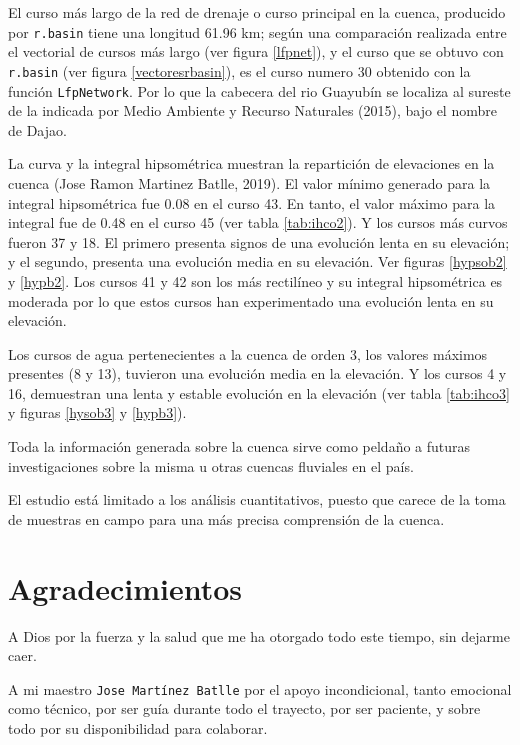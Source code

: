 \documentclass[11pt,]{article}
\begin{document}
El curso más largo de la red de drenaje o curso principal en la cuenca,
producido por \texttt{r.basin} tiene una longitud 61.96 km; según una
comparación realizada entre el vectorial de cursos más largo (ver figura
\ref{lfpnet}), y el curso que se obtuvo con \texttt{r.basin} (ver figura
\ref{vectoresrbasin}), es el curso numero 30 obtenido con la función
\texttt{LfpNetwork}. Por lo que la cabecera del rio Guayubín se localiza
al sureste de la indicada por Medio Ambiente y Recurso Naturales (2015),
bajo el nombre de Dajao.

La curva y la integral hipsométrica muestran la repartición de
elevaciones en la cuenca (Jose Ramon Martinez Batlle, 2019). El valor
mínimo generado para la integral hipsométrica fue 0.08 en el curso 43.
En tanto, el valor máximo para la integral fue de 0.48 en el curso 45
(ver tabla \ref{tab:ihco2}). Y los cursos más curvos fueron 37 y 18. El
primero presenta signos de una evolución lenta en su elevación; y el
segundo, presenta una evolución media en su elevación. Ver figuras
\ref{hypsob2} y \ref{hypb2}. Los cursos 41 y 42 son los más rectilíneo y
su integral hipsométrica es moderada por lo que estos cursos han
experimentado una evolución lenta en su elevación.

Los cursos de agua pertenecientes a la cuenca de orden 3, los valores
máximos presentes (8 y 13), tuvieron una evolución media en la
elevación. Y los cursos 4 y 16, demuestran una lenta y estable evolución
en la elevación (ver tabla \ref{tab:ihco3} y figuras \ref{hysob3} y
\ref{hypb3}).

Toda la información generada sobre la cuenca sirve como peldaño a
futuras investigaciones sobre la misma u otras cuencas fluviales en el
país.

El estudio está limitado a los análisis cuantitativos, puesto que carece
de la toma de muestras en campo para una más precisa comprensión de la
cuenca.

\section{Agradecimientos}\label{agradecimientos}

A Dios por la fuerza y la salud que me ha otorgado todo este tiempo, sin
dejarme caer.

A mi maestro \texttt{Jose\ Martínez\ Batlle} por el apoyo incondicional,
tanto emocional como técnico, por ser guía durante todo el trayecto, por
ser paciente, y sobre todo por su disponibilidad para colaborar.
\end{document}
